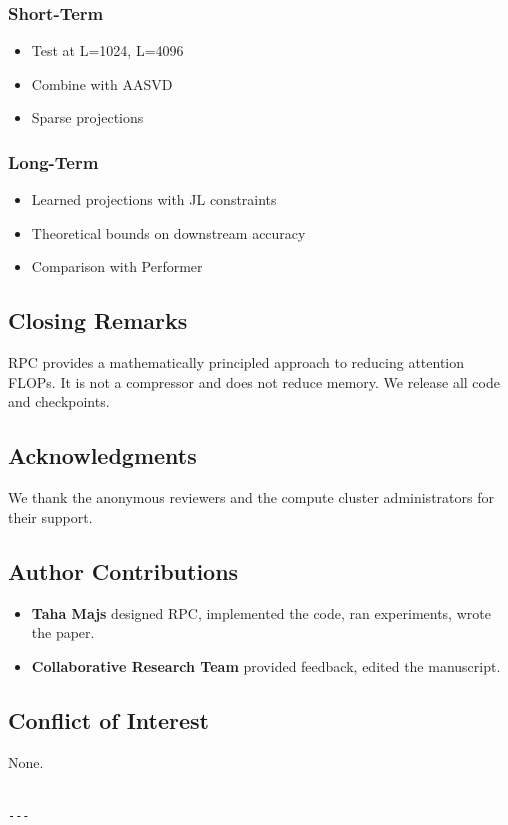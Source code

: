 \subsubsection{Short-Term}
\begin{itemize}
\item Test at L=1024, L=4096
\item Combine with AASVD
\item Sparse projections

\end{itemize}
\subsubsection{Long-Term}
\begin{itemize}
\item Learned projections with JL constraints
\item Theoretical bounds on downstream accuracy
\item Comparison with Performer

\end{itemize}
\subsection{Closing Remarks}

RPC provides a mathematically principled approach to reducing attention 
FLOPs. It is not a compressor and does not reduce memory. We release all 
code and checkpoints.

\subsection{Acknowledgments}

We thank the anonymous reviewers and the compute cluster administrators for their support.

\subsection{Author Contributions}

\begin{itemize}
\item \textbf{Taha Majs} designed RPC, implemented the code, ran experiments,
  wrote the paper.
\item \textbf{Collaborative Research Team} provided feedback, edited the manuscript.

\end{itemize}
\subsection{Conflict of Interest}

None.
\begin{lstlisting}

---
\end{lstlisting}